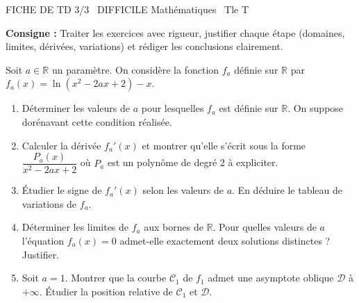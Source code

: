 \documentclass[11pt]{article}
\begin{document}
\begin{tcolorbox}[enhanced,colback=popink,colframe=popink,arc=10pt,boxrule=0pt,left=12pt,right=12pt,top=9pt,bottom=9pt]
{\color{white}\popxbold\small FICHE DE TD 3/3 \textbullet\ DIFFICILE \hfill Mathématiques \textbullet\ Tle T\par}
\end{tcolorbox}
\vspace{4pt}
\noindent \textbf{Consigne :} Traiter les exercices avec rigueur, justifier chaque étape (domaines, limites, dérivées, variations) et rédiger les conclusions clairement.

\begin{exercice}
Soit $a \in \mathbb{R}$ un paramètre. On considère la fonction $f_a$ définie sur $\mathbb{R}$ par $f_a(x) = \ln(x^2 - 2ax + 2) - x$.
\begin{enumerate}
    \item Déterminer les valeurs de $a$ pour lesquelles $f_a$ est définie sur $\mathbb{R}$. On suppose dorénavant cette condition réalisée.
    \item Calculer la dérivée $f_a'(x)$ et montrer qu'elle s'écrit sous la forme $\dfrac{P_a(x)}{x^2 - 2ax + 2}$ où $P_a$ est un polynôme de degré 2 à expliciter.
    \item Étudier le signe de $f_a'(x)$ selon les valeurs de $a$. En déduire le tableau de variations de $f_a$.
    \item Déterminer les limites de $f_a$ aux bornes de $\mathbb{R}$. Pour quelles valeurs de $a$ l'équation $f_a(x) = 0$ admet-elle exactement deux solutions distinctes ? Justifier.
    \item Soit $a=1$. Montrer que la courbe $\mathcal{C}_1$ de $f_1$ admet une asymptote oblique $\mathcal{D}$ à $+\infty$. Étudier la position relative de $\mathcal{C}_1$ et $\mathcal{D}$.
\end{enumerate}
\end{exercice}
\end{document}

